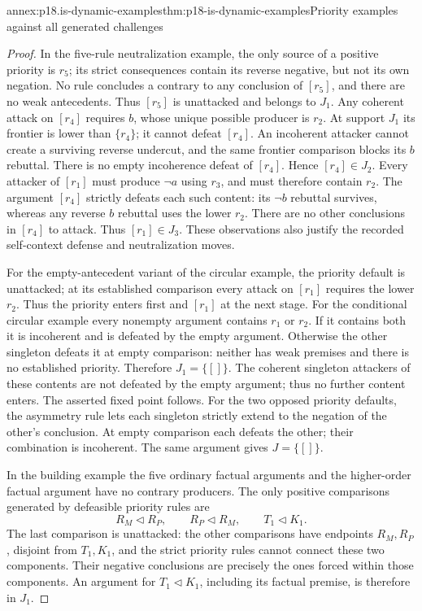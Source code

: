 \begin{annexitem}{annex:p18.is-dynamic-examples}{thm:p18-is-dynamic-examples}{Priority examples against all generated challenges}
\begin{proof}
In the five-rule neutralization example, the only source of a positive priority is
\(r_5\); its strict consequences contain its reverse negative,
but not its own negation. No rule concludes a contrary to any
conclusion of \([r_5]\), and there are no weak antecedents.
Thus \([r_5]\) is unattacked and belongs to \(J_1\).
Any coherent attack on \([r_4]\) requires \(b\), whose unique
possible producer is \(r_2\). At support \(J_1\) its frontier
is lower than \(\{r_4\}\); it cannot defeat \([r_4]\).
An incoherent attacker cannot create a surviving reverse
undercut, and the same frontier comparison blocks its \(b\)
rebuttal. There is no empty incoherence defeat of \([r_4]\).
Hence \([r_4]\in J_2\).
Every attacker of \([r_1]\) must produce \(\neg a\) using
\(r_3\), and must therefore contain \(r_2\).
The argument \([r_4]\) strictly defeats each such content:
its \(\neg b\) rebuttal survives, whereas any reverse \(b\)
rebuttal uses the lower \(r_2\). There are no other conclusions
in \([r_4]\) to attack. Thus \([r_1]\in J_3\).
These observations also justify the recorded self-context
defense and neutralization moves.

For the empty-antecedent variant of the circular example,
the priority default is unattacked; at its established comparison
every attack on \([r_1]\) requires the lower \(r_2\).
Thus the priority enters first and \([r_1]\) at the next stage.
For the conditional circular example every nonempty argument contains
\(r_1\) or \(r_2\). If it contains both it is incoherent and is
defeated by the empty argument. Otherwise the other singleton
defeats it at empty comparison: neither has weak premises and
there is no established priority. Therefore \(J_1=\{[]\}\).
The coherent singleton attackers of these contents are not
defeated by the empty argument; thus no further content enters.
The asserted fixed point follows. For the two opposed priority
defaults, the asymmetry rule lets each singleton strictly extend
to the negation of the other's conclusion. At empty comparison
each defeats the other; their combination is incoherent.
The same argument gives \(J=\{[]\}\).

In the building example the five ordinary factual arguments and
the higher-order factual argument have no contrary producers.
The only positive comparisons generated by defeasible priority
rules are
\[
R_M\triangleleft R_P,\qquad R_P\triangleleft R_M,\qquad
T_1\triangleleft K_1.
\]
The last comparison is unattacked: the other comparisons have
endpoints \(R_M,R_P\), disjoint from \(T_1,K_1\), and the strict
priority rules cannot connect these two components.
Their negative conclusions are precisely the ones forced within
those components. An argument for \(T_1\triangleleft K_1\),
including its factual premise, is therefore in \(J_1\).


\end{proof}
\end{annexitem}
